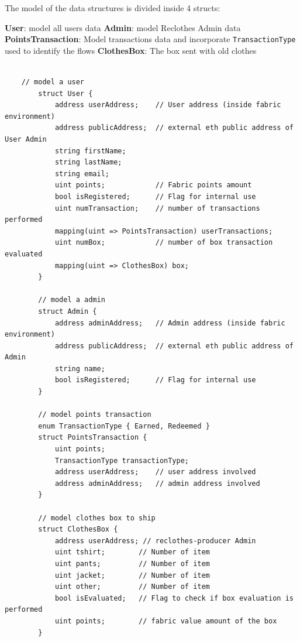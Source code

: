 The model of the data structures is divided inside 4 structs:

\begin{outline}[enumerate]
    \1 \textbf{User}: model all users data
    \1 \textbf{Admin}: model Reclothes Admin data
    \1 \textbf{PointsTransaction}: Model transactions data and incorporate \texttt{TransactionType} used to identify the flows
    \1 \textbf{ClothesBox}: The box sent with old clothes 
\end{outline}

\begin{lstlisting}[language=Solidity]
       
    // model a user
        struct User {
            address userAddress;    // User address (inside fabric environment)
            address publicAddress;  // external eth public address of User Admin
            string firstName;
            string lastName;
            string email;
            uint points;            // Fabric points amount
            bool isRegistered;      // Flag for internal use
            uint numTransaction;    // number of transactions performed
            mapping(uint => PointsTransaction) userTransactions;
            uint numBox;            // number of box transaction evaluated
            mapping(uint => ClothesBox) box;
        }
    
        // model a admin
        struct Admin {
            address adminAddress;   // Admin address (inside fabric environment)
            address publicAddress;  // external eth public address of Admin
            string name;
            bool isRegistered;      // Flag for internal use
        }
    
        // model points transaction
        enum TransactionType { Earned, Redeemed }
        struct PointsTransaction {
            uint points;
            TransactionType transactionType;
            address userAddress;    // user address involved
            address adminAddress;   // admin address involved
        }
    
        // model clothes box to ship
        struct ClothesBox {
            address userAddress; // reclothes-producer Admin
            uint tshirt;        // Number of item
            uint pants;         // Number of item
            uint jacket;        // Number of item
            uint other;         // Number of item
            bool isEvaluated;   // Flag to check if box evaluation is performed
            uint points;        // fabric value amount of the box
        }
\end{lstlisting}

